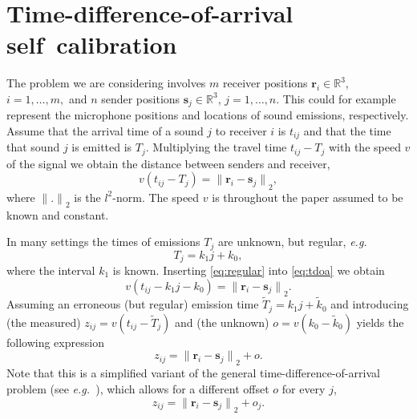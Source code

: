 \documentclass{article}
\def\ltwo{{$l^2$}}
\def \fatR {{ \mathbb R}}
\providecommand{\norm}[1]{\lVert#1\rVert}
\def\eg{\emph{e.g.\ }}
\begin{document}
\section{Time-difference-of-arrival self~calibration}
\label{sec:todoa}
\vspace{-5pt}
The problem we are considering involves $m$ receiver positions  $\mathbf{r}_i \in \fatR^3$, $ i = 1, \dots, m,$ and  
$n$ sender positions $\mathbf{s}_j \in \fatR^3$, $ j = 1, \dots, n$.
This could for example represent the microphone positions and locations of sound emissions, respectively.  
Assume that the arrival time of a sound $j$ to receiver $i$ is $t_{ij}$ and that the time that sound $j$ is emitted is $T_j$. 
Multiplying the travel time $t_{ij} - T_j$ with the speed $v$ of the signal we obtain the distance between senders and receiver,
\begin{equation}
v (t_{ij}-T_j)   = {\norm{\mathbf{r}_i - \mathbf{s}_j}}_2 ,
\label{eq:tdoa}
\end{equation} 
where  ${\norm{.}}_2$ is the \ltwo-norm. The speed $v$ is throughout the paper assumed to be  known and constant. 

In many settings the times of emissions $T_j$ are unknown, but regular, \eg
\begin{equation}
T_j = k_1 j + k_0, 
\label{eq:regular}
\end{equation}
where the interval $k_1$ is known. Inserting \eqref{eq:regular} into \eqref{eq:tdoa} we
obtain 
\begin{equation}
v (t_{ij}-k_1 j - k_0)   = {\norm{\mathbf{r}_i - \mathbf{s}_j}}_2 . 
\end{equation}
Assuming an erroneous (but regular) emission time 
$\tilde{T}_j = k_1 j + \tilde{k}_0$ and 
introducing (the measured) $z_{ij} = v (t_{ij}-\tilde{T}_j)$ and (the unknown) $o = v (k_0-\tilde{k}_0)$ yields the following expression
\begin{equation}
 z_{ij}   = {\norm{\mathbf{r}_i - \mathbf{s}_j}}_2 + o. 
\end{equation}
Note that this is a simplified variant of the general time-difference-of-arrival problem (see \eg  \cite{kuang2013stratified}), which allows for a different offset $o$ for every $j$, 
\begin{equation}
 z_{ij}   = {\norm{\mathbf{r}_i - \mathbf{s}_j}}_2 + o_j.
\end{equation} 
\end{document}
